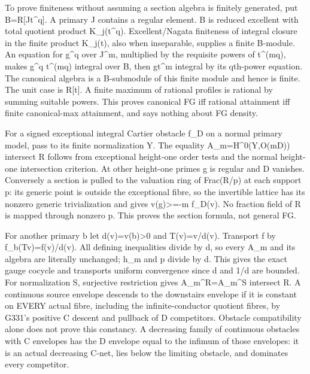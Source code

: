 \documentclass[11pt]{article}
\begin{document}
To prove finiteness without assuming a section algebra is finitely generated, put B=R[Jt\textasciicircum{}q]. A primary J contains a regular element. B is reduced excellent with total quotient product K\_j(t\textasciicircum{}q). Excellent/Nagata finiteness of integral closure in the finite product K\_j(t), also when inseparable, supplies a finite B-module. An equation for g\textasciicircum{}q over J\textasciicircum{}m, multiplied by the requisite powers of t\textasciicircum{}(mq), makes g\textasciicircum{}q t\textasciicircum{}(mq) integral over B, then gt\textasciicircum{}m integral by its qth-power equation. The canonical algebra is a B-submodule of this finite module and hence is finite. The unit case is R[t]. A finite maximum of rational profiles is rational by summing suitable powers. This proves canonical FG iff rational attainment iff finite canonical-max attainment, and says nothing about FG density.

For a signed exceptional integral Cartier obstacle f\_D on a normal primary model, pass to its finite normalization Y. The equality A\_m=H\textasciicircum{}0(Y,O(mD)) intersect R follows from exceptional height-one order tests and the normal height-one intersection criterion. At other height-one primes g is regular and D vanishes. Conversely a section is pulled to the valuation ring of Frac(R/p) at each support p: its generic point is outside the exceptional fibre, so the invertible lattice has its nonzero generic trivialization and gives v(g)>=-m f\_D(v). No fraction field of R is mapped through nonzero p. This proves the section formula, not general FG.

For another primary b let d(v)=v(b)>0 and T(v)=v/d(v). Transport f by f\_b(Tv)=f(v)/d(v). All defining inequalities divide by d, so every A\_m and its algebra are literally unchanged; h\_m and p divide by d. This gives the exact gauge cocycle and transports uniform convergence since d and 1/d are bounded. For normalization S, surjective restriction gives A\_m\textasciicircum{}R=A\_m\textasciicircum{}S intersect R. A continuous source envelope descends to the downstairs envelope if it is constant on EVERY actual fibre, including the infinite-conductor quotient fibres, by G331's positive C descent and pullback of D competitors. Obstacle compatibility alone does not prove this constancy. A decreasing family of continuous obstacles with C envelopes has the D envelope equal to the infimum of those envelopes: it is an actual decreasing C-net, lies below the limiting obstacle, and dominates every competitor.
\end{document}
